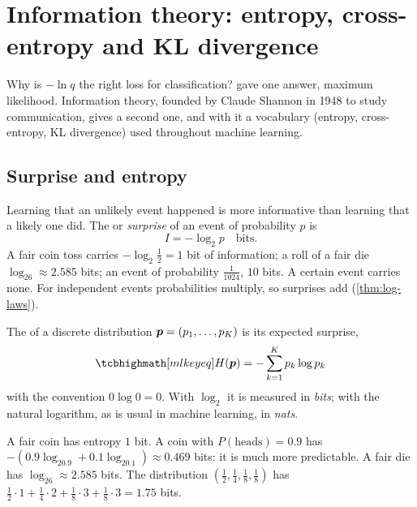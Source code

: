 \section{Information theory: entropy, cross-entropy and KL divergence}\label{sec:information-theory}

Why is $-\ln q$ the right loss for classification?  gave one
answer, maximum likelihood. Information theory, founded by Claude Shannon in
1948 to study communication, gives a second one, and with it a vocabulary
(entropy, cross-entropy, KL divergence) used throughout machine learning.

\subsection{Surprise and entropy}

Learning that an unlikely event happened is more informative than learning that
a likely one did. The  or \emph{surprise} of an event
of probability $p$ is
\[
  I = -\log_2 p \quad\text{bits}.
\]
A fair coin toss carries $-\log_2\frac12 = 1$ bit of information; a roll of a fair
die $\log_26 \approx 2.585$ bits; an event of probability $\frac{1}{1024}$, $10$
bits. A certain event carries none. For independent events probabilities
multiply, so surprises add (\cref{thm:log-laws}).

\begin{definition}[Entropy]\label{def:entropy}
The  of a discrete distribution $\bm{p} = (p_1, \dots, p_K)$ is its
expected surprise,
\[
  \keyeq{H(\vp) = -\sum_{k=1}^K p_k\log p_k}
\]
with the convention $0\log0 = 0$. With $\log_2$ it is measured in \emph{bits};
with the natural logarithm, as is usual in machine learning, in \emph{nats}.
\end{definition}

\begin{example}[Entropies]\label{ex:entropies}
A fair coin has entropy $1$ bit. A coin with $P(\text{heads}) = 0.9$ has
$-(0.9\log_20.9 + 0.1\log_20.1) \approx 0.469$ bits: it is much more predictable. A
fair die has $\log_26 \approx 2.585$ bits. The distribution
$\left(\frac12, \frac14, \frac18, \frac18\right)$ has
$\frac12\cdot1 + \frac14\cdot2 + \frac18\cdot3 + \frac18\cdot3 = 1.75$ bits.
\end{example}

